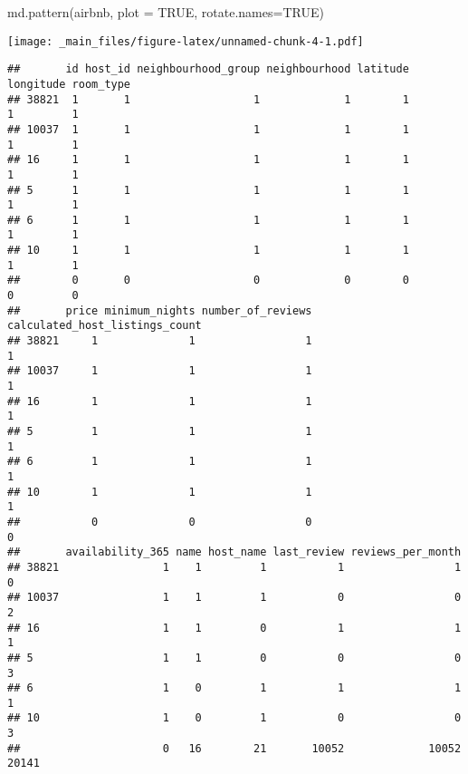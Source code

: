 \documentclass[
]{book}
\newenvironment{Shaded}{\begin{snugshade}}{\end{snugshade}}
\newcommand{\AttributeTok}[1]{\textcolor[rgb]{0.77,0.63,0.00}{#1}}
\newcommand{\ConstantTok}[1]{\textcolor[rgb]{0.00,0.00,0.00}{#1}}
\newcommand{\FunctionTok}[1]{\textcolor[rgb]{0.00,0.00,0.00}{#1}}
\newcommand{\NormalTok}[1]{#1}
\begin{document}
\begin{Shaded}
\begin{Highlighting}[]
\FunctionTok{md.pattern}\NormalTok{(airbnb, }\AttributeTok{plot =} \ConstantTok{TRUE}\NormalTok{, }\AttributeTok{rotate.names=}\ConstantTok{TRUE}\NormalTok{)}
\end{Highlighting}
\end{Shaded}

\texttt{[image: \_main\_files/figure-latex/unnamed-chunk-4-1.pdf]}

\begin{verbatim}
##       id host_id neighbourhood_group neighbourhood latitude longitude room_type
## 38821  1       1                   1             1        1         1         1
## 10037  1       1                   1             1        1         1         1
## 16     1       1                   1             1        1         1         1
## 5      1       1                   1             1        1         1         1
## 6      1       1                   1             1        1         1         1
## 10     1       1                   1             1        1         1         1
##        0       0                   0             0        0         0         0
##       price minimum_nights number_of_reviews calculated_host_listings_count
## 38821     1              1                 1                              1
## 10037     1              1                 1                              1
## 16        1              1                 1                              1
## 5         1              1                 1                              1
## 6         1              1                 1                              1
## 10        1              1                 1                              1
##           0              0                 0                              0
##       availability_365 name host_name last_review reviews_per_month      
## 38821                1    1         1           1                 1     0
## 10037                1    1         1           0                 0     2
## 16                   1    1         0           1                 1     1
## 5                    1    1         0           0                 0     3
## 6                    1    0         1           1                 1     1
## 10                   1    0         1           0                 0     3
##                      0   16        21       10052             10052 20141
\end{verbatim}
\end{document}
